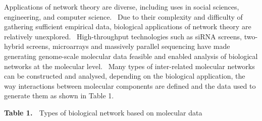 Applications of network theory are diverse, including uses in social sciences, engineering, and computer science. \ Due to their complexity and difficulty of gathering sufficient empirical data, biological applications of network theory are relatively unexplored. \ High-throughput technologies such as siRNA screens, two-hybrid screens, microarrays and massively parallel sequencing have made generating genome-scale molecular data feasible and enabled analysis of biological networks at the molecular level. \ Many types of inter-related molecular networks can be constructed and analysed, depending on the biological application, the way interactions between molecular components are defined and the data used to generate them as shown in Table 1. \ 

\textbf{Table 1. \ }Types of biological network based on molecular data
